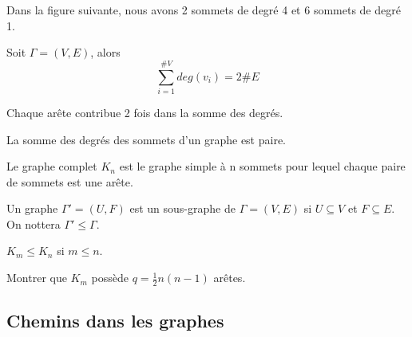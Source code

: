 \begin{exmp}
Dans la figure suivante, nous avons 2 sommets de degré 4 et 6 sommets de degré 1.
\end{exmp}



\begin{thrm}
Soit $\Gamma = (V,E)$, alors $$\sum_{i=1}^{\#V} deg(v_{i}) = 2\#E$$
\end{thrm}

\begin{demo}
Chaque arête contribue 2 fois dans la somme des degrés.
\end{demo}

\begin{corll}
La somme des degrés des sommets d'un graphe est paire. \\
\end{corll}

\newpage

\begin{defn}
Le graphe complet $K_{n}$ est le graphe simple à n sommets pour lequel chaque paire de sommets est une arête.
\end{defn}

\begin{exmp}
	
\end{exmp}

\begin{defn}
Un graphe ${\Gamma}'=(U,F)$ est un sous-graphe de $\Gamma=(V,E)$ si $ U \subseteq V$ et $F \subseteq E$. On nottera $ {\Gamma}' \leq \Gamma$.
\end{defn}

\begin{exmp}
$ K_{m} \leq K_{n}$ si $ m \leq n$.
\end{exmp}

\begin{exo}
Montrer que $K_{m}$ possède $ q=\frac{1}{2}n(n-1)$ arêtes.
\end{exo}


\subsection{Chemins dans les graphes}

